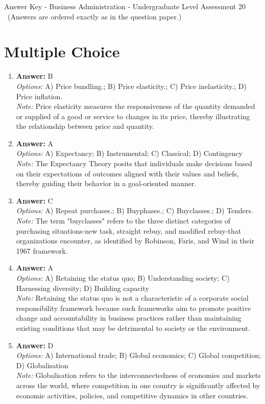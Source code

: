 \documentclass[12pt]{article}
\begin{document}
\begin{center}
Answer Key - Business Administration - Undergraduate Level Assessment 20 \
\small (Answers are ordered exactly as in the question paper.)
\end{center}

\section*{Multiple Choice}
\begin{enumerate}[label=\arabic*.]
\item \textbf{Answer:} B
\\ \textit{Options:} A) Price bundling.; B) Price elasticity.; C) Price inelasticity.; D) Price inflation.
\\ \textit{Note:} Price elasticity measures the responsiveness of the quantity demanded or supplied of a good or service to changes in its price, thereby illustrating the relationship between price and quantity.
\item \textbf{Answer:} A
\\ \textit{Options:} A) Expectancy; B) Instrumental; C) Classical; D) Contingency
\\ \textit{Note:} The Expectancy Theory posits that individuals make decisions based on their expectations of outcomes aligned with their values and beliefs, thereby guiding their behavior in a goal-oriented manner.
\item \textbf{Answer:} C
\\ \textit{Options:} A) Repeat purchases.; B) Buyphases.; C) Buyclasses.; D) Tenders.
\\ \textit{Note:} The term "buyclasses" refers to the three distinct categories of purchasing situations-new task, straight rebuy, and modified rebuy-that organizations encounter, as identified by Robinson, Faris, and Wind in their 1967 framework.
\item \textbf{Answer:} A
\\ \textit{Options:} A) Retaining the status quo; B) Understanding society; C) Harnessing diversity; D) Building capacity
\\ \textit{Note:} Retaining the status quo is not a characteristic of a corporate social responsibility framework because such frameworks aim to promote positive change and accountability in business practices rather than maintaining existing conditions that may be detrimental to society or the environment.
\item \textbf{Answer:} D
\\ \textit{Options:} A) International trade; B) Global economics; C) Global competition; D) Globalisation
\\ \textit{Note:} Globalisation refers to the interconnectedness of economies and markets across the world, where competition in one country is significantly affected by economic activities, policies, and competitive dynamics in other countries.
\end{enumerate}
\end{document}
